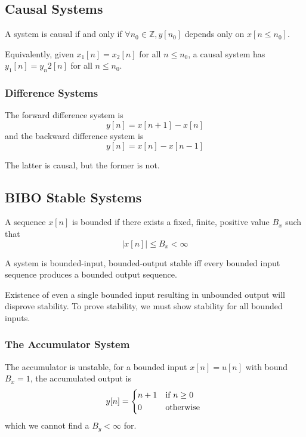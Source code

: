 \documentclass{article}
\begin{document}
\subsection{Causal Systems}
A system is causal if and only if $\forall n_0\in\mathbb{Z}, y[n_0]$ depends only on $x[n \le  n_0]$.

Equivalently, given $x_1[n]=x_2[n]$ for all $n\le n_0$, a causal system has $y_1[n]=y_n2[n]$ for all $n\le n_0$.

\subsubsection{Difference Systems}
The forward difference system is
\begin{equation}
    y[n] = x[n+1]-x[n]
\end{equation}
and the backward difference system is
\begin{equation}
    y[n] = x[n]-x[n-1]
\end{equation}

The latter is causal, but the former is not.

\subsection{BIBO Stable Systems}
A sequence $x[n]$ is bounded if there exists a fixed, finite, positive value $B_x$ such that
\begin{equation}
    |x[n]|\le B_x<\infty
\end{equation}

A system is bounded-input, bounded-output stable iff every bounded input sequence produces a bounded output sequence.

Existence of even a single bounded input resulting in unbounded output will disprove stability. To prove stability, we must show stability for all bounded inputs.

\subsubsection{The Accumulator System}
The accumulator is unstable, for a bounded input $x[n]=u[n]$ with bound $B_x=1$, the accumulated output is
\[y[n] = \begin{cases*}
n+1 &if $n\ge 0$\\
0 & otherwise
\end{cases*}
\]
which we cannot find a $B_y<\infty$ for.
\end{document}
